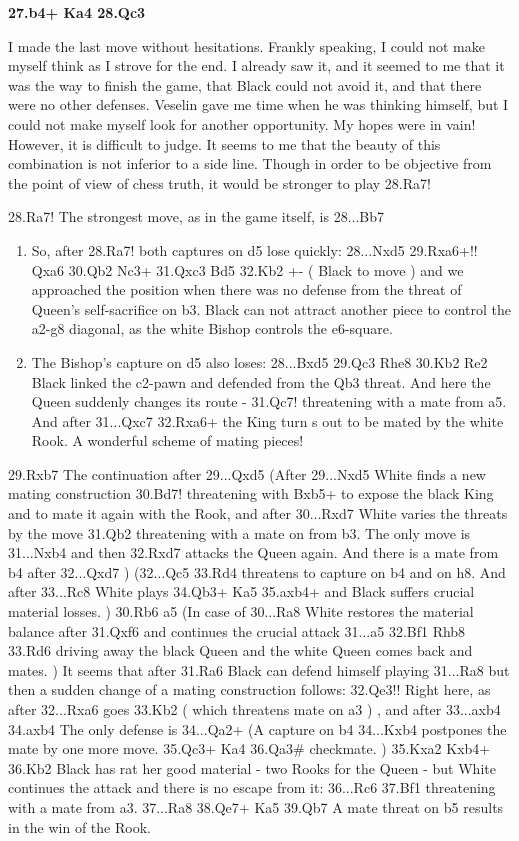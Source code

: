 \documentclass[
	11pt,twocolumn]{article}
\renewcommand{\bf}{\bfseries}
\begin{document}
{\bf 27.b4+ Ka4 28.Qc3 }

I made the last move without hesitations. Frankly speaking, I could not make myself think as I strove for the end. I already saw it, and it seemed to me that it was the way to finish the game, that Black could not avoid it, and that there were no other defenses. Veselin gave me time when he was thinking himself, but I could not make myself look for another opportunity. My hopes were in vain! However, it is difficult to judge. It seems to me that the beauty of this combination is not inferior to a side line. Though in order to be objective from the point of view of chess truth, it would be stronger to play 28.Ra7!



28.Ra7!  The strongest move, as in the game itself, is 28...Bb7 

\begin{enumerate}
\item
So, after 28.Ra7! both captures on d5 lose quickly: 28...Nxd5 29.Rxa6+!! Qxa6 30.Qb2 Nc3+ 31.Qxc3 Bd5 32.Kb2 +- ( Black to move ) and we approached the position when there was no defense from the threat of Queen's self-sacrifice on b3. Black can not attract another piece to control the a2-g8 diagonal, as the white Bishop controls the e6-square. 

\item
The Bishop's capture on d5 also loses: 28...Bxd5 29.Qc3 Rhe8 30.Kb2 Re2  Black linked the c2-pawn and defended from the Qb3 threat. And here the Queen suddenly changes its route - 31.Qc7!  threatening with a mate from a5. And after 31...Qxc7 32.Rxa6+ the King turn s out to be mated by the white Rook. A wonderful scheme of mating pieces! 
\end{enumerate}

29.Rxb7  The continuation after 29...Qxd5 (After 29...Nxd5  White finds a new mating construction 30.Bd7!  threatening with Bxb5+ to expose the black King and to mate it again with the Rook, and after 30...Rxd7  White varies the threats by the move 31.Qb2  threatening with a mate on from b3. The only move is 31...Nxb4  and then 32.Rxd7  attacks the Queen again. And there is a mate from b4 after 32...Qxd7  ) (32...Qc5 33.Rd4  threatens to capture on b4 and on h8. And after 33...Rc8  White plays 34.Qb3+ Ka5 35.axb4+ and Black suffers crucial material losses. ) 30.Rb6 a5   (In case of 30...Ra8  White restores the material balance after 31.Qxf6  and continues the crucial attack 31...a5 32.Bf1 Rhb8 33.Rd6 driving away the black Queen and the white Queen comes back and mates. ) It seems that after 31.Ra6  Black can defend himself playing 31...Ra8  but then a sudden change of a mating construction follows: 32.Qe3!!  Right here, as after 32...Rxa6  goes 33.Kb2  ( which threatens mate on a3 ) , and after 33...axb4 34.axb4  The only defense is 34...Qa2+ (A capture on b4 34...Kxb4  postpones the mate by one more move. 35.Qc3+ Ka4 36.Qa3\# checkmate. ) 35.Kxa2 Kxb4+ 36.Kb2  Black has rat her good material - two Rooks for the Queen - but White continues the attack and there is no escape from it: 36...Rc6 37.Bf1  threatening with a mate from a3. 37...Ra8 38.Qe7+ Ka5 39.Qb7 A mate threat on b5 results in the win of the Rook. 
\end{document}
